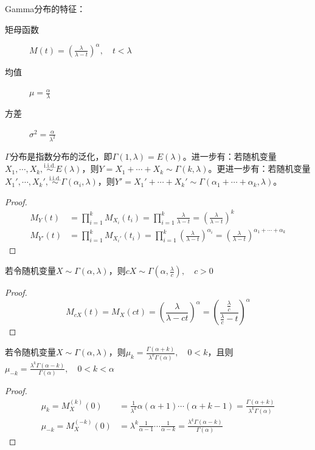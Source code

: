Gamma分布的特征：
\begin{description}
    \item[矩母函数] $M(t)=(\frac{\lambda}{\lambda-t})^{\alpha} , \quad t<\lambda$
    \item[均值] $\mu=\frac{\alpha}{\lambda}$
    \item[方差] $\sigma^2=\frac{\alpha}{\lambda^{2}}$
\end{description}

\begin{proposition}\label{prop:sum_of_Gamma}
    $\Gamma$分布是指数分布的泛化，即$\Gamma(1,\lambda)=E(\lambda)$。进一步有：若随机变量$X_1,\cdots ,X_k, \overset{\text{i.i.d.}}{\sim} E(\lambda)$，则$Y=X_1+\cdots+X_k \sim \Gamma(k,\lambda)$。更进一步有：若随机变量$X_1',\cdots ,X_k', \overset{\text{i.i.d.}}{\sim} \Gamma(\alpha_i,\lambda)$，则$Y'=X_1'+\cdots+X_k'  \sim \Gamma(\alpha_1+\cdots +\alpha_k,\lambda)$。
\end{proposition}
\begin{proof}
    \begin{align*}
        M_Y(t)    & =\prod_{i=1}^k M_{X_i}(t_i)=\prod_{i=1}^k \frac{\lambda}{\lambda-t}=(\frac{\lambda}{\lambda-t})^{k}                                       \\
        M_{Y'}(t) & =\prod_{i=1}^k M_{X_i'}(t_i)=\prod_{i=1}^k (\frac{\lambda}{\lambda-t})^{\alpha_i}=(\frac{\lambda}{\lambda-t})^{\alpha_1+\cdots +\alpha_k}
    \end{align*}
\end{proof}

\begin{proposition}
    若令随机变量$X \sim \Gamma(\alpha,\lambda)$，则$cX \sim \Gamma(\alpha,\frac{\lambda}{c}), \quad c>0$
\end{proposition}
\begin{proof}
    \[ M_{c X}(t) = M_X(c t) =(\frac{\lambda}{\lambda-c t})^{\alpha}=(\frac{\frac{\lambda}{c}}{\frac{\lambda}{c}-t})^{\alpha}\]
\end{proof}

\begin{proposition}
    若令随机变量$X \sim \Gamma(\alpha,\lambda)$，则$\mu_k=\frac{\Gamma(\alpha+k)}{\lambda^{k}\Gamma(\alpha)}, \quad 0<k$，且则$\mu_{-k}=\frac{\lambda^{k}\Gamma(\alpha-k)}{\Gamma(\alpha)}, \quad 0<k<\alpha$
\end{proposition}
\begin{proof}
    \begin{align*}
        \mu_k=M_X^{(k)}(0)     & =\frac{1}{\lambda^{k}}\alpha(\alpha+1)\cdots(\alpha+k-1) =\frac{\Gamma(\alpha+k)}{\lambda^{k}\Gamma(\alpha)} \\
        \mu_{-k}=M_X^{(-k)}(0) & =\lambda^{k}\frac{1}{\alpha-1}\cdots\frac{1}{\alpha-k} =\frac{\lambda^{k}\Gamma(\alpha-k)}{\Gamma(\alpha)}
    \end{align*}
\end{proof}

